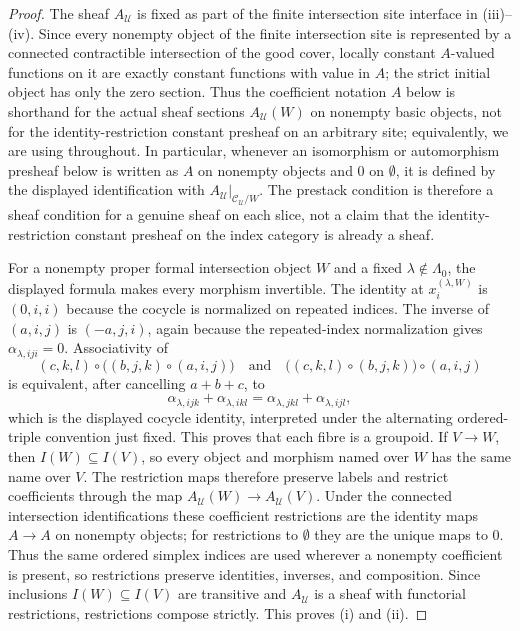 \begin{proof}
The sheaf $A_{\mathcal U}$ is fixed as part of the finite intersection site interface in
(iii)--(iv). Since every
nonempty object of the finite intersection site is represented by a connected
contractible intersection of the good cover, locally constant
$A$-valued functions on it are exactly constant functions with value in
$A$; the strict initial object has only the zero section. Thus the
coefficient notation $A$ below is shorthand for the actual sheaf sections
$A_{\mathcal U}(W)$ on nonempty basic objects, not for the
identity-restriction constant presheaf on an arbitrary site; equivalently,
we are using  throughout.
In particular, whenever an isomorphism or automorphism presheaf below is
written as \(A\) on nonempty objects and \(0\) on \(\emptyset\), it is
defined by the displayed identification with
\(A_{\mathcal U}|_{\mathcal C_{\mathcal U}/W}\). The prestack condition is
therefore a sheaf condition for a genuine sheaf on each slice, not a
claim that the identity-restriction constant presheaf on the index
category is already a sheaf.

For a nonempty proper formal intersection object $W$ and a fixed
$\lambda\notin\Lambda_0$, the displayed formula makes every morphism
invertible. The identity at $x_i^{(\lambda,W)}$ is $(0,i,i)$ because the
cocycle is normalized on repeated indices. The inverse of $(a,i,j)$ is
$(-a,j,i)$, again because the repeated-index normalization gives
$\alpha_{\lambda,iji}=0$. Associativity of
\[
(c,k,l)\circ\bigl((b,j,k)\circ(a,i,j)\bigr)
\quad\text{and}\quad
\bigl((c,k,l)\circ(b,j,k)\bigr)\circ(a,i,j)
\]
is equivalent, after cancelling $a+b+c$, to
\[
\alpha_{\lambda,ijk}+\alpha_{\lambda,ikl}
=
\alpha_{\lambda,jkl}+\alpha_{\lambda,ijl},
\]
which is the displayed cocycle identity, interpreted under the alternating
ordered-triple convention just fixed. This proves that each fibre is a
groupoid. If $V\to W$, then $I(W)\subseteq I(V)$, so every object and
morphism named over $W$ has the same name over $V$. The restriction maps
therefore preserve labels and restrict coefficients through the map
\(A_{\mathcal U}(W)\to A_{\mathcal U}(V)\). Under the connected
intersection identifications these coefficient restrictions are the
identity maps \(A\to A\) on nonempty objects; for restrictions to
\(\emptyset\) they are the unique maps to \(0\). Thus the same ordered
simplex indices are used wherever a nonempty coefficient is present, so
restrictions preserve identities, inverses, and composition. Since
inclusions \(I(W)\subseteq I(V)\) are transitive and
\(A_{\mathcal U}\) is a sheaf with functorial restrictions, restrictions
compose strictly. This proves \textup{(i)} and \textup{(ii)}.


\end{proof}
